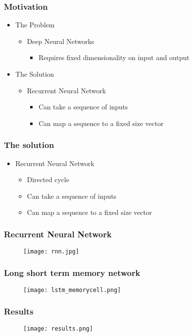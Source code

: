 \begin{frame}
	\frametitle{Motivation}
	\begin{itemize}
		\item The Problem
		\begin{itemize}
			\item Deep Neural Networks
			\begin{itemize}
				\item Requires fixed dimensionality on input and output
			\end{itemize}
		\end{itemize}
		\item The Solution
		\begin{itemize}
			\item Recurrent Neural Network
			\begin{itemize}
				\item Can take a sequence of inputs
				\item Can map a sequence to a fixed size vector
			\end{itemize}
		\end{itemize}
	\end{itemize}


\end{frame}

\begin{frame}
	\frametitle{The solution}
	\begin{itemize}
		\item Recurrent Neural Network
		\begin{itemize}
			\item Directed cycle
			\item Can take a sequence of inputs
			\item Can map a sequence to a fixed size vector
		\end{itemize}
	\end{itemize}
\end{frame}

\begin{frame}
	\frametitle{Recurrent Neural Network}
	\begin{figure}
		\centering
		\texttt{[image: rnn.jpg]}
	\end{figure}
\end{frame}

\begin{frame}
	\frametitle{Long short term memory network}
	\begin{figure}
		\centering
		\texttt{[image: lstm\_memorycell.png]}
	\end{figure}
\end{frame}

\begin{frame}
	\frametitle{Results}
	\begin{figure}
		\centering
		\texttt{[image: results.png]}
	\end{figure}
\end{frame}